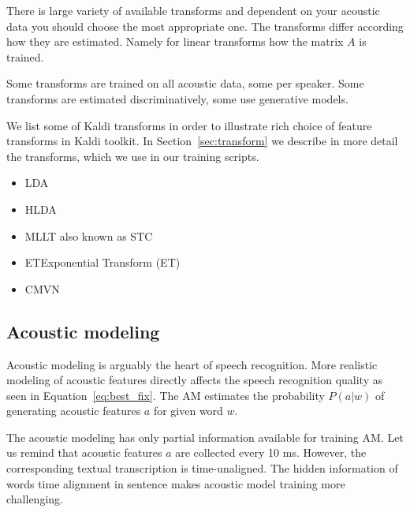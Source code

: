 {There is large variety of available transforms and 
dependent on your acoustic data you should choose the most appropriate one.
The transforms differ according how they are estimated.
Namely for linear transforms how the matrix $A$ is trained.

Some transforms are trained on all acoustic data, some per speaker.
Some transforms are estimated discriminatively, some use generative models.

We list some of Kaldi transforms in order to illustrate
rich choice of feature transforms in Kaldi toolkit.
In Section~\ref{sec:transform} we describe in more detail the transforms,
which we use in our training scripts.

\begin{itemize}
    \item \acl{LDA}\cite{gopinath1998maximum}
    \item \acl{HLDA}\cite{gales1999semi}
    \item \acl{MLLT} also known as \acl{STC}\cite{gopinath1998maximum}
    \item \acl{ET}Exponential Transform (ET)\cite{povey2011exponential}
    \item \acl{CMVN}\cite{molau2003feature}
\end{itemize}




\subsection{Acoustic modeling}
\label{sub:am}
Acoustic modeling is arguably the heart of speech recognition.
More realistic modeling of acoustic features directly affects the speech recognition quality 
as seen in Equation~\ref{eq:best_fix}. 
The \ac{AM} estimates the probability $P(a|w)$ of generating acoustic features $a$
for given word $w$.

The acoustic modeling has only partial information available for training \ac{AM}.
Let us remind that acoustic features $a$ are collected every 10 ms.
However, the corresponding textual transcription is time-unaligned.
The hidden information of words time alignment in sentence
makes acoustic model training more challenging.

}
